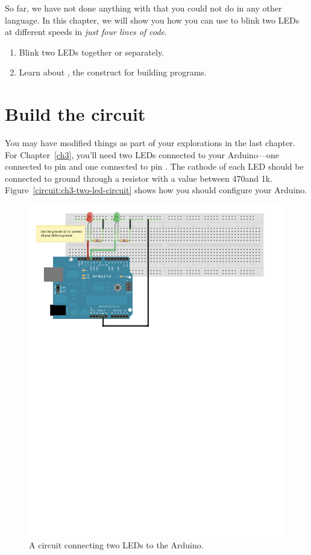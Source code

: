 So far, we have not done anything with \plumbing that you could not do in any other language. In this chapter, we will show you how you can use \plumbing to blink two LEDs at different speeds in {\em just four lines of code}. 

\GOALS
\begin{enumerate}
	\item Blink two LEDs together or separately.
	\item Learn about \PAR, the \occam construct for building \PARallel programs.
\end{enumerate}

\section{Build the circuit}
You may have modified things as part of your explorations in the last chapter. For Chapter~\ref{ch3}, you'll need two LEDs connected to your Arduino---one connected to pin \pineleven and one connected to pin \pintwelve. The cathode of each LED should be connected to ground through a resistor with a value between 470\ohm and 1k\ohm. Figure~\vref{circuit:ch3-two-led-circuit} shows how you should configure your Arduino.	

\begin{figure}[ht]
  \begin{center}
    \includegraphics[width=0.8\linewidth]{images/ch3-two-led-circuit}
    \caption{A circuit connecting two LEDs to the Arduino.}
    \label{circuit:ch3-two-led-circuit}
  \end{center}
\end{figure}

